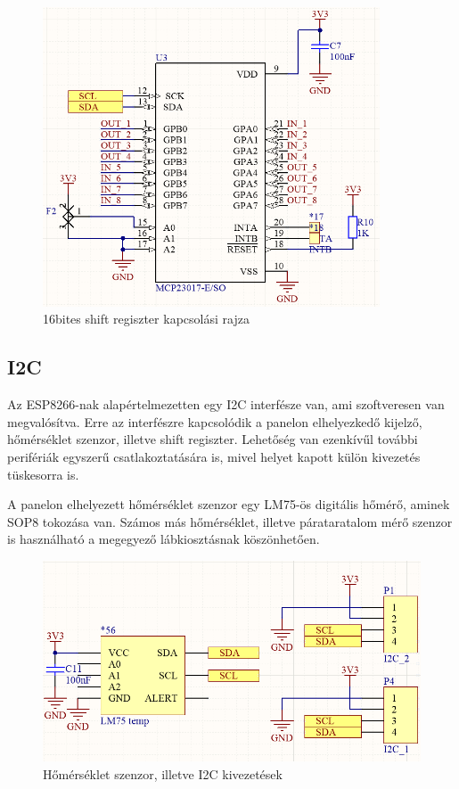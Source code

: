 \begin{figure}[!h]
    \centering
    \includegraphics[width=100mm, keepaspectratio]{figures/16bit_shift_register.png}
    \caption{16bites shift regiszter kapcsolási rajza}
    \label{fig:TeXstudio}
\end{figure}



\subsection{I2C}
Az ESP8266-nak alapértelmezetten egy I2C interfésze van, ami szoftveresen van megvalósítva. Erre az interfészre kapcsolódik a panelon elhelyezkedő kijelző, hőmérséklet szenzor, illetve shift regiszter. Lehetőség van ezenkívűl további perifériák egyszerű csatlakoztatására is, mivel helyet kapott külön kivezetés tüskesorra is.

A panelon elhelyezett hőmérséklet szenzor egy LM75-ös digitális hőmérő, aminek SOP8 tokozása van. Számos más hőmérséklet, illetve párataratalom mérő szenzor is használható a megegyező lábkiosztásnak köszönhetően.
\begin{figure}[!ht]
    \centering
    \includegraphics[width=130mm, keepaspectratio]{figures/i2c_devices.png}
    \caption{Hőmérséklet szenzor, illetve I2C kivezetések}
    \label{fig:TeXstudio}
\end{figure}

